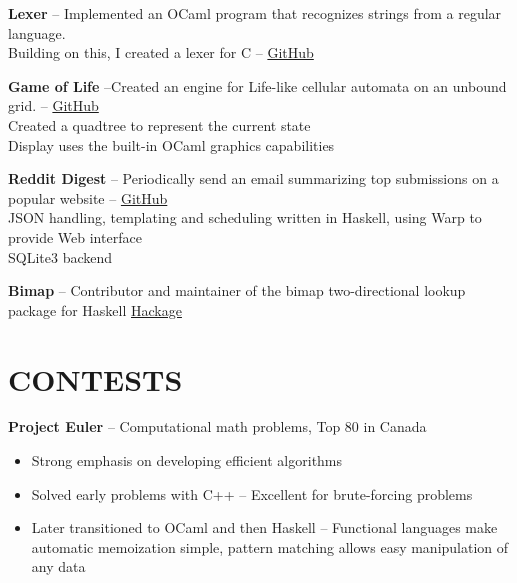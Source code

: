 \documentclass{res}
\begin{document}
\begin{resume}
    {\bf Lexer} -- Implemented an OCaml program that recognizes strings from a regular language.\\
    \hspace*{10mm}  Building on this, I created a lexer for C --
    \href{https://www.github.com/joelwilliamson/ndfa}{GitHub}
    \vspace{-3mm}

    {\bf Game of Life} --Created an engine for Life-like cellular automata on an unbound grid. --
    \href{https://www.github.com/joelwilliamson/life}{GitHub} \\
    \hspace*{10mm}  Created a quadtree to represent the current state \\
    \hspace*{10mm}  Display uses the built-in OCaml graphics capabilities
    \vspace{-3mm}

    {\bf Reddit Digest} -- Periodically send an email summarizing top submissions on a popular website --
    \href{https://github.com/joelwilliamson/reddit-digest}{GitHub}\\
    \hspace*{10mm}  JSON handling, templating and scheduling written in Haskell, using Warp to provide Web interface \\
    \hspace*{10mm}  SQLite3 backend
    \vspace{-3mm}

    {\bf Bimap} -- Contributor and maintainer of the bimap two-directional lookup package for Haskell
    \href{http://hackage.haskell.org/package/bimap-0.3.0}{Hackage}
    
\section{CONTESTS}
        {\bf Project Euler} -- Computational math problems, Top 80 in Canada
        \begin{itemize}
          \item Strong emphasis on developing efficient algorithms
          \item Solved early problems with C++ -- Excellent for brute-forcing problems
          \item Later transitioned to OCaml and then Haskell --
            Functional languages make automatic memoization simple, pattern matching allows easy manipulation of any data
        \end{itemize}
    \vspace {-3mm}



\end{resume}
\end{document}
